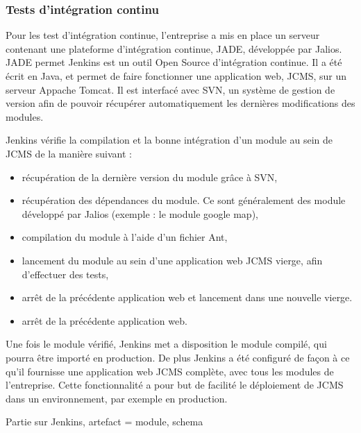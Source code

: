 \documentclass[12pt,a4paper]{article}
\begin{document}
\subsubsection{Tests d'intégration continu}
Pour les test d'intégration continue, l'entreprise a mis en place un serveur contenant une plateforme d'intégration continue, \gls{JADE}, développée par Jalios. \gls{JADE} permet
Jenkins est un outil Open Source d'intégration continue. Il a été écrit en Java, et permet de faire fonctionner une application web, \gls{JCMS}, sur un serveur Appache Tomcat. Il est interfacé avec  \gls{SVN}, un système de gestion de version afin de pouvoir récupérer automatiquement les dernières modifications des modules.\par 
Jenkins vérifie la compilation et la bonne intégration d'un module au sein de \gls{JCMS} de la manière suivant :
\begin{itemize}
\item récupération de la dernière version du module grâce à \gls{SVN},
\item récupération des dépendances du module. Ce sont généralement des module développé par Jalios (exemple : le module google map),
\item compilation du module à l'aide d'un fichier Ant,
\item lancement du module au sein d'une application web \gls{JCMS} vierge, afin d'effectuer des tests,
\item arrêt de la précédente application web et lancement dans une nouvelle vierge.
\item arrêt de la précédente application web.
\end{itemize}\par 
Une fois le module vérifié, Jenkins met a disposition le module compilé, qui pourra être importé en production. De plus Jenkins a été configuré de façon à ce qu'il fournisse une application web \gls{JCMS} complète, avec tous les modules de l'entreprise. Cette fonctionnalité a pour but de facilité le déploiement de \gls{JCMS} dans un environnement, par exemple en production.\par 
\medskip
Partie sur Jenkins, artefact = module, schema

\newpage
\end{document}
